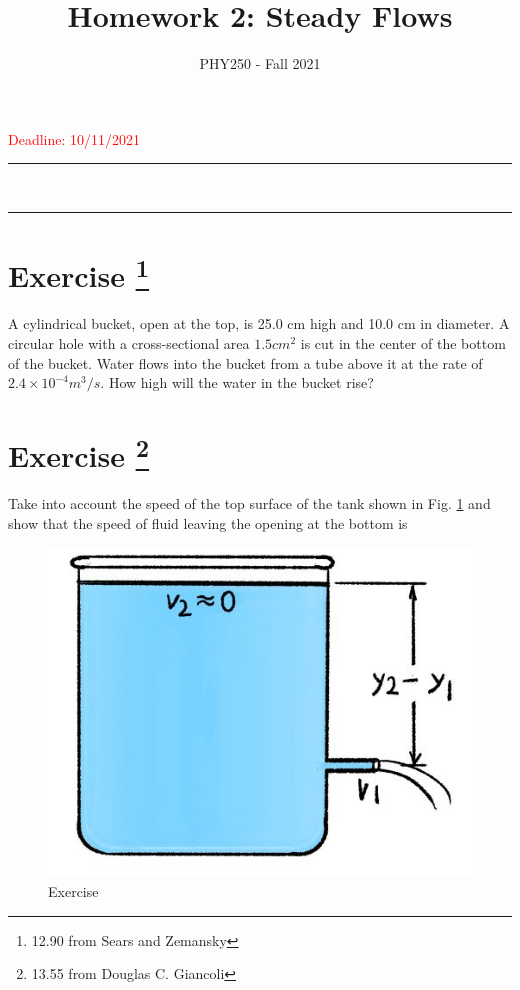 \documentclass[12pt]{article}
\title{Homework 2: Steady Flows}
\author{PHY250 - Fall 2021}
\date{}
\newcommand{\HRule}{\rule{\linewidth}{0.5mm}}
\begin{document}
\maketitle

\textcolor{red}{Deadline: 10/11/2021}

\vspace{5mm}

\begin{spacing}{0.3}
    \noindent
    \HRule\\
    \HRule
\end{spacing}
\vspace{5mm}




\setcounter{example}{1}

\section*{Exercise \theexample \footnote{12.90 from Sears and Zemansky}}

A cylindrical bucket, open at the top, is 25.0 cm high
and 10.0 cm in diameter. A circular hole with a cross-sectional
area $1.5 cm^2$ is cut in the center of the bottom of the bucket.
Water flows into the bucket from a tube above it at the rate of 
$2.4\times10^{-4}m^3/s$.
How high will the water in the bucket rise?


\section*{Exercise \theexample \footnote{13.55 from Douglas C. Giancoli}}

Take into account the speed of the top
surface of the tank shown in  Fig. \ref{0} and show that the speed of fluid leaving
the opening at the bottom is

\begin{figure}[h!]
  \begin{center}
    \includegraphics[height=2.in]{images/Bernoulli2.jpg}
    \caption{Exercise \theexample }
    \label{0}
  \end{center}
\end{figure}
\end{document}
